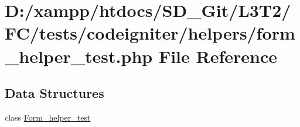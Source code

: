 \hypertarget{tests_2codeigniter_2helpers_2form__helper__test_8php}{}\section{D\+:/xampp/htdocs/\+S\+D\+\_\+\+Git/\+L3\+T2/\+F\+C/tests/codeigniter/helpers/form\+\_\+helper\+\_\+test.php File Reference}
\label{tests_2codeigniter_2helpers_2form__helper__test_8php}
\subsection*{Data Structures}
\begin{DoxyCompactItemize}
\item 
class \hyperlink{class_form__helper__test}{Form\+\_\+helper\+\_\+test}
\end{DoxyCompactItemize}
